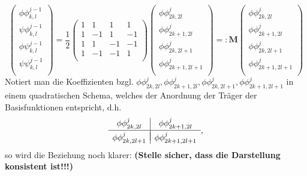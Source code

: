 \documentclass{article}
\begin{document}
\[
\begin{pmatrix}
\phi\phi_{k,l}^{j-1} \\
\psi\phi_{k,l}^{j-1} \\
\phi\psi_{k,l}^{j-1} \\
\psi\psi_{k,l}^{j-1} \\
\end{pmatrix}
= \frac{1}{2}
\begin{pmatrix}
1 & 1 & 1 & 1 \\
1 & -1 & 1 & -1 \\
1 & 1 & -1 & -1 \\
1 & -1 & -1 & 1 \\
\end{pmatrix}
\begin{pmatrix}
\phi\phi_{2k,2l}^{j} \\
\phi\phi_{2k+1,2l}^{j} \\
\phi\phi_{2k,2l+1}^{j} \\
\phi\phi_{2k+1,2l+1}^{j} \\
\end{pmatrix}
=:
\mathbf{M}
\begin{pmatrix}
\phi\phi_{2k,2l}^{j} \\
\phi\phi_{2k+1,2l}^{j} \\
\phi\phi_{2k,2l+1}^{j} \\
\phi\phi_{2k+1,2l+1}^{j} \\
\end{pmatrix}
\]
%
Notiert man die Koeffizienten bzgl. $\phi\phi_{2k,2l}^{j}, \phi\phi_{2k+1,2l}^{j}, \phi\phi_{2k,2l+1}^{j}, \phi\phi_{2k+1,2l+1}^{j}$ in einem quadratischen Schema, welches der Anordnung der Träger der Basisfunktionen entspricht, d.h.
%
\[
\begin{array}{c|c}
\phi\phi_{2k,2l}^{j} & \phi\phi_{2k+1,2l}^{j} \\[.05cm] 
\hline \\[-0.35cm]
\phi\phi_{2k,2l+1}^{j} & \phi\phi_{2k+1,2l+1}^{j}
\end{array}
,
\]
%
so wird die Beziehung noch klarer: \textbf{(Stelle sicher, dass die Darstellung konsistent ist!!!)}
%
\end{document}
